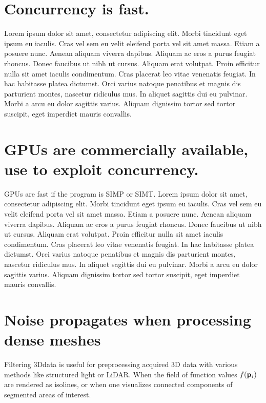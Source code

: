 \section{Concurrency is fast.}
Lorem ipsum dolor sit amet, consectetur adipiscing elit. Morbi tincidunt eget 
ipsum eu iaculis. Cras vel sem eu velit eleifend porta vel sit amet massa. Etiam 
a posuere nunc. Aenean aliquam viverra dapibus. Aliquam ac eros a purus feugiat 
rhoncus. Donec faucibus ut nibh ut cursus. Aliquam erat volutpat. Proin efficitur 
nulla sit amet iaculis condimentum. Cras placerat leo vitae venenatis feugiat. In 
hac habitasse platea dictumst. Orci varius natoque penatibus et magnis dis 
parturient montes, nascetur ridiculus mus. In aliquet sagittis dui eu pulvinar. 
Morbi a arcu eu dolor sagittis varius. Aliquam dignissim tortor sed tortor 
suscipit, eget imperdiet mauris convallis.~\cite[p.~00]{todoCitation}\todoCitation



\section{GPUs are commercially available, use to exploit concurrency.}
GPUs are fast if the program is SIMP or SIMT.%
%
Lorem ipsum dolor sit amet, consectetur adipiscing elit. Morbi tincidunt eget 
ipsum eu iaculis. Cras vel sem eu velit eleifend porta vel sit amet massa. Etiam 
a posuere nunc. Aenean aliquam viverra dapibus. Aliquam ac eros a purus feugiat 
rhoncus. Donec faucibus ut nibh ut cursus. Aliquam erat volutpat. Proin efficitur 
nulla sit amet iaculis condimentum. Cras placerat leo vitae venenatis feugiat. In 
hac habitasse platea dictumst. Orci varius natoque penatibus et magnis dis 
parturient montes, nascetur ridiculus mus. In aliquet sagittis dui eu pulvinar. 
Morbi a arcu eu dolor sagittis varius. Aliquam dignissim tortor sed tortor 
suscipit, eget imperdiet mauris convallis.~\cite[p.~00]{todoCitation}\todoCitation



\section{Noise propagates when processing dense meshes}
Filtering 3Ddata is useful for preprocessing acquired 3D data with various methods like structured light or LiDAR.
When the field of function values $f(\mathbf{p}_i)$ are rendered as isolines, or when one visualizes connected components of segmented areas of interest.

